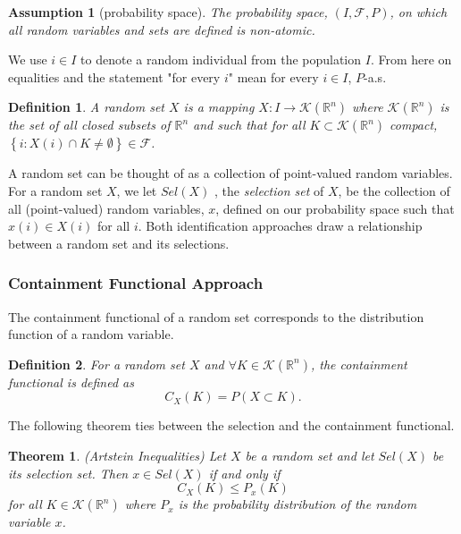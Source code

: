 \documentclass[reqno]{article}
\newtheorem{theorem}{Theorem}
\newtheorem{definition}{Definition}
\newtheorem{Assumption}{Assumption}
\begin{document}
\begin{Assumption}[probability space]\label{probSpace}
The probability space, $(I,\mathcal{F} ,P)$, on which all random variables and sets are defined is non-atomic.
\end{Assumption}

We use $i \in I$ to denote a random individual from the population $I$. From here on equalities and the statement "for every $i$" mean for every $i\in I$, $P$-a.s. 

\begin{definition}
A random set $X$ is a mapping $X:I \rightarrow \mathcal{K}\left(\mathbb{R}^{n}\right) $ where $\mathcal{K}\left(\mathbb{R}^{n}\right) $ is the set of all closed subsets of $\mathbb{R}^{n}$ and such that for all $K\subset \mathcal{K}\left(\mathbb{R}^{n}\right) $ compact, $\left\{ i:X\left( i\right) \cap K\neq \emptyset \right\} \in \mathcal{F}$.
\end{definition}

A random set can be thought of as a collection of point-valued random variables. For a random set $X$, we let $Sel\left(X\right)$ , the \textit{selection set} of $X$, be the collection of all (point-valued) random variables, $x$, defined on our probability space such that $x\left( i\right) \in X\left(i\right) $ for all $i$. Both identification approaches draw a relationship between a random set and its selections.

\subsubsection{Containment Functional Approach}
The containment functional of a random set corresponds to the distribution function of a random variable.

\begin{definition}
For a random set $X$ and $\forall K\in \mathcal{K}\left( \mathbb{R}^{n}\right) $, the containment functional is defined as%
\begin{equation*}
C_{X}\left( K\right) =P\left( X\subset K\right) .
\end{equation*}
\end{definition}

The following theorem ties between the selection and the containment functional. 

\begin{theorem}
(Artstein Inequalities) Let $X$ be a random set and let $Sel\left( X\right) $
be its selection set. Then $x\in Sel\left( X\right) $ if and only if 
\begin{equation*}
C_{X}\left( K\right) \leq P_{x}\left( K\right)
\end{equation*}%
for all $K\in \mathcal{K}\left( \mathbb{R}^{n}\right) $ where $P_{x}$ is the probability distribution of the random variable $x$.
\end{theorem}
\end{document}

